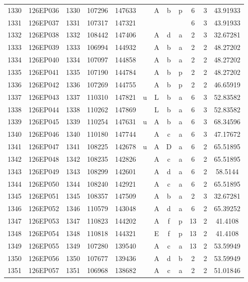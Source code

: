 \begin{tabular}{|*{12}{c|}}
1330 & 126EP036 & 1330 & 107296 & 147633 &  & A & b & p & 6 & 3 & 43.91933 \\ 
1331 & 126EP037 & 1331 & 107317 & 147321 &  &  &  &  & 6 & 3 & 43.91933 \\ 
1332 & 126EP038 & 1332 & 108442 & 147406 &  & A & d & a & 2 & 3 & 32.67281 \\ 
1333 & 126EP039 & 1333 & 106994 & 144932 &  & A & b & a & 2 & 2 & 48.27202 \\ 
1334 & 126EP040 & 1334 & 107097 & 144858 &  & A & b & a & 2 & 2 & 48.27202 \\ 
1335 & 126EP041 & 1335 & 107190 & 144784 &  & A & b & p & 2 & 2 & 48.27202 \\ 
1336 & 126EP042 & 1336 & 107269 & 144755 &  & A & b & p & 2 & 2 & 46.65919 \\ 
1337 & 126EP043 & 1337 & 110310 & 147821 & u & L & b & a & 6 & 3 & 52.83582 \\ 
1338 & 126EP044 & 1338 & 110262 & 147869 &  & L & b & a & 6 & 3 & 52.83582 \\ 
1339 & 126EP045 & 1339 & 110254 & 147631 & u & A & b & a & 6 & 3 & 68.34596 \\ 
1340 & 126EP046 & 1340 & 110180 & 147744 &  & A & c & a & 6 & 3 & 47.17672 \\ 
1341 & 126EP047 & 1341 & 108225 & 142678 & u & A & D & a & 6 & 2 & 65.51895 \\ 
1342 & 126EP048 & 1342 & 108235 & 142826 &  & A & c & a & 6 & 2 & 65.51895 \\ 
1343 & 126EP049 & 1343 & 108299 & 142601 &  & A & d & a & 6 & 2 & 58.5144 \\ 
1344 & 126EP050 & 1344 & 108240 & 142921 &  & A & c & a & 6 & 2 & 65.51895 \\ 
1345 & 126EP051 & 1345 & 108357 & 147509 &  & A & b & a & 2 & 3 & 32.67281 \\ 
1346 & 126EP052 & 1346 & 110579 & 143048 &  & A & d & a & 6 & 2 & 65.39252 \\ 
1347 & 126EP053 & 1347 & 110823 & 144202 &  & A & f & p & 13 & 2 & 41.4108 \\ 
1348 & 126EP054 & 1348 & 110818 & 144321 &  & E & f & p & 13 & 2 & 41.4108 \\ 
1349 & 126EP055 & 1349 & 107280 & 139540 &  & A & c & a & 13 & 2 & 53.59949 \\ 
1350 & 126EP056 & 1350 & 107677 & 139436 &  & A & d & b & 2 & 2 & 53.59949 \\ 
1351 & 126EP057 & 1351 & 106968 & 138682 &  & A & c & a & 2 & 2 & 51.01846 \\ 

\end{tabular}
